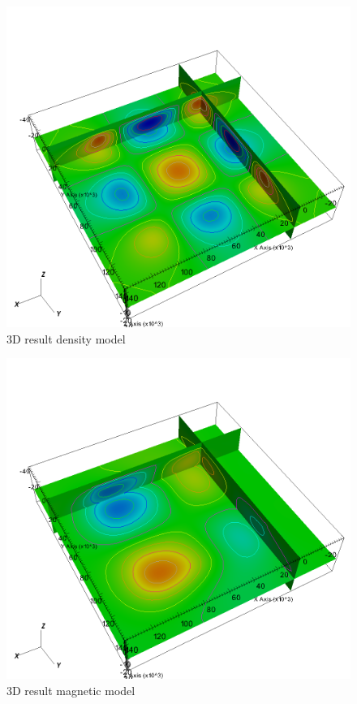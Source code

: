 \begin{figure}
\centering
\includegraphics[width=\textwidth]{joint3D4mag6grav-g.png}
\caption{3D result density model}

\end{figure}


\begin{figure}
\centering
\includegraphics[width=\textwidth]{joint3D4mag6grav-m.png}
\caption{3D result magnetic model}

\end{figure}

